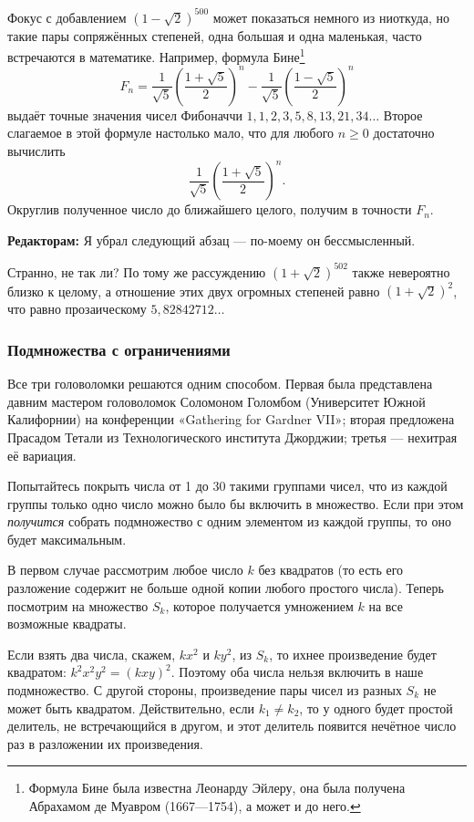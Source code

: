 Фокус с добавлением $(1-\sqrt{2})^{500}$ может показаться немного из ниоткуда, но такие пары сопряжённых степеней, одна большая и одна маленькая, часто встречаются в математике.
Например, формула Бине\footnote{Формула Бине была известна Леонарду Эйлеру, она была получена Абрахамом де Муавром (1667---1754), а может и до него.}
\[F_n=\frac{1}{\sqrt{5}}\left(\frac{1+\sqrt{5}}2\right)^n-\frac{1}{\sqrt{5}}\left(\frac{1-\sqrt{5}}2\right)^n\]
выдаёт точные значения чисел Фибоначчи $1, 1, 2, 3, 5, 8, 13, 21, 34 \dots$
Второе слагаемое в этой формуле настолько мало, что для любого $n \ge 0$ достаточно вычислить
\[\frac{1}{\sqrt{5}}\left(\frac{1+\sqrt{5}}2\right)^n.\]
Округлив полученное число до ближайшего целого, получим в точности $F_n$.

\begin{addedbytheeditors}
\textbf{Редакторам:}
Я убрал следующий абзац --- по-моему он бессмысленный.

Странно, не так ли?
По тому же рассуждению $(1+\sqrt{2})^{502}$ также невероятно близко к целому,
а отношение этих двух огромных степеней равно $(1+\sqrt{2})^{2}$, что равно прозаическому  $5{,}82842712\dots$
\end{addedbytheeditors}

\subsubsection*{Подмножества с ограничениями}

Все три головоломки решаются одним способом.
Первая была представлена давним мастером головоломок Соломоном Голомбом (Университет Южной Калифорнии) на конференции
«Ga\-the\-ring for Gard\-ner VII»;
вторая предложена Прасадом Тетали из Технологического института Джорджии;
третья --- нехитрая её вариация.

Попытайтесь покрыть числа от 1 до 30 такими группами чисел, что из каждой группы только одно число можно было бы включить в множество.
Если при этом \emph{получится} собрать подмножество с одним элементом из каждой группы, то оно будет максимальным.

В первом случае рассмотрим любое число $k$ без квадратов (то есть его разложение содержит не больше одной копии любого простого числа).
Теперь посмотрим на множество $S_k$, которое получается умножением $k$ на все возможные квадраты.

Если взять два числа, скажем, $kx^2$ и $ky^2$, из $S_k$, то ихнее произведение будет квадратом: $k^2x^2y^2 = (kxy)^2$.
Поэтому оба числа нельзя включить в наше подмножество.
С другой стороны, произведение пары чисел из разных $S_k$ не может быть квадратом.
Действительно, если $k_1\ne k_2$, то у одного будет простой делитель, не встречающийся в другом, и этот делитель появится нечётное число раз в разложении их произведения.

